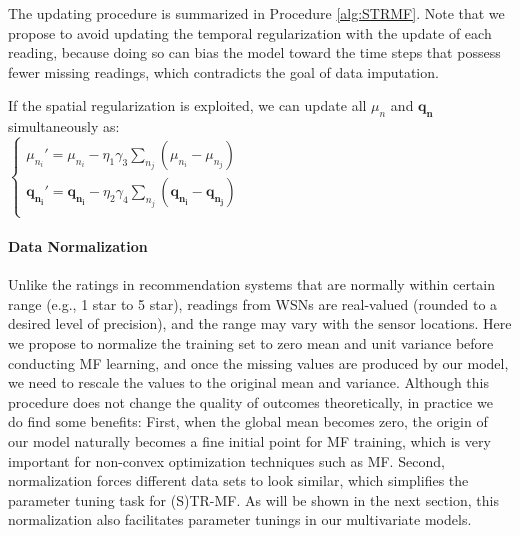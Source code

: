 The updating procedure is summarized in Procedure \ref{alg:STRMF}. Note that we propose to avoid updating the temporal regularization with the update of each reading, because doing so can bias the model toward the time steps that possess fewer missing readings, which contradicts the goal of data imputation. 

If the spatial regularization is exploited, we can update all $\mu_n$ and $\mathbf{q_n}$ simultaneously as:\\
\indent $\begin{cases}
	\mu_{n_i}' = \mu_{n_i} - \eta_1 \gamma_3 \sum_{n_j}{(\mu_{n_i} - \mu_{n_j})}\\
	\mathbf{q_{n_i}}' = \mathbf{q_{n_i}} - \eta_2 \gamma_4 \sum_{n_j}{(\mathbf{q_{n_i}} - \mathbf{q_{n_j}})}\\
	\end{cases}$\\


\paragraph*{Data Normalization}
Unlike the ratings in recommendation systems that are normally within certain range (e.g., 1 star to 5 star), readings from WSNs are real-valued (rounded to a desired level of precision), and the range may vary with the sensor locations.
Here we propose to normalize the training set to zero mean and unit variance before conducting MF learning, and once the missing values are produced by our model, we need to rescale the values to the original mean and variance.
Although this procedure does not change the quality of outcomes theoretically, in practice we do find some benefits: 
First, when the global mean becomes zero, the origin of our model naturally becomes a fine initial point for MF training, which is very important for non-convex optimization techniques such as MF.
Second, normalization forces different data sets to look similar, which simplifies the parameter tuning task for (S)TR-MF. 
As will be shown in the next section, this normalization also facilitates parameter tunings in our multivariate models.  



